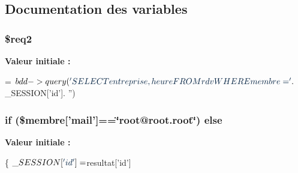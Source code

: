 \subsection{Documentation des variables}
\hypertarget{connexion_8php_a7ca1585a5f3ef438efdf8b51d390282b}{
\subsubsection[{\$req2}]{\setlength{\rightskip}{0pt plus 5cm}\$req2}}\label{connexion_8php_a7ca1585a5f3ef438efdf8b51d390282b}
{\bfseries Valeur initiale \-:}
\begin{DoxyCode}
= $bdd->query(\textcolor{stringliteral}{'SELECT entreprise, heure FROM rdv}
\textcolor{stringliteral}{                WHERE membre='} .$\_SESSION[\textcolor{stringliteral}{'id'}]. \textcolor{stringliteral}{''})
\end{DoxyCode}
\hypertarget{connexion_8php_a26918388d4c6e2a1bb1736a8b054db94}{
\subsubsection[{else}]{\setlength{\rightskip}{0pt plus 5cm}if (\$membre\mbox{[}'mail'\mbox{]}==\char`\"{}root@root.\-root\char`\"{}) else}}\label{connexion_8php_a26918388d4c6e2a1bb1736a8b054db94}
{\bfseries Valeur initiale \-:}
\begin{DoxyCode}
\{
            $\_SESSION[\textcolor{stringliteral}{'id'}] = $resultat[\textcolor{stringliteral}{'id'}]
\end{DoxyCode}
